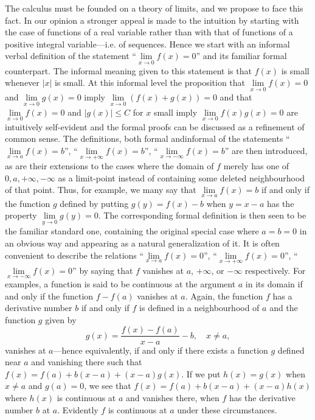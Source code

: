 The calculus must be founded on a theory of limits, and we propose to
face this fact. In our opinion a stronger appeal is made to the
intuition by starting with the case of functions of a real variable
rather than with that of functions of a positive integral
variable---i.e. of sequences. Hence we start with an informal verbal
definition of the statement ``$\lim\limits_{x \to 0} f (x) = 0$'' and
its familiar formal counterpart. The informal meaning given to this
statement is that $f(x)$ is small whenever $|x|$ is small. At this
informal level the proposition that $\lim\limits_{x \to 0} f(x) = 0$
and $\lim\limits_{x \to 0} g(x) = 0$ imply $\lim\limits_{x \to 0}
(f(x) + g(x)) = 0$ and that $\lim\limits_{x \to 0} f(x) = 0$ and
$|g(x)| \leqslant C$ for $x$ small imply $\lim\limits_{x \to 0} f(x)
g(x) = 0$ are intuitively self-evident and the formal proofs can be
discussed as a refinement of common sense. The definitions, both
formal and\pageoriginale informal of the statements ``$\lim\limits_{x \to a} f (x) =
b$'', ``$\lim\limits_{x \to + \infty} f(x) = b$'', ``$\lim\limits_{x
  \to - \infty} f (x) = b$'' are then introduced, as are their
extensions to the cases where the domain of $f$ merely has one of $0,
a, + \infty, -\infty$ as a limit-point instead of containing some
deleted neighbourhood of that point. Thus, for example, we many say
that $\lim\limits_{x \to a} f(x) = b$ if and  only if the function $g$
defined by putting $g(y) = f(x) - b$ when $y = x - a$ has the property
$\lim\limits_{y \to 0} g(y) =0$. The corresponding formal definition
is then seen to be the familiar standard one, containing the original
special case where $a =b = 0$ in an obvious way and appearing as a
natural generalization of it. It is often convenient to describe the
relations ``$\lim\limits_{x \to a} f(x) = 0$'', ``$\lim\limits_{x \to
  + \infty} f(x) = 0$'', ``$\lim\limits_{x \to - \infty} f(x) = 0$''
by saying that $f$ vanishes at $a$, $+ \infty$, or $-\infty$
respectively. For examples, a function is said to be continuous at the
argument $a$ in its domain if and only if the function $f - f(a)$
vanishes at $a$. Again, the function $f$ has a derivative number $b$
if and only if $f$ is defined in a neighbourhood of $a$ and the
function $g$ given by
$$
g(x) = \frac{f(x) - f(a)}{x - a} - b, \quad x \neq a,
$$
vanishes at $a$---hence equivalently, if and only if there exists a
function $g$ defined near $a$ and vanishing there such that $f(x) =
f(a) + b(x -a) + (x -a) g(x)$. If we put $h(x) = g(x)$ when $ x\neq a$
and $g(a) = 0$, we see that $f(x) = f(a) + b(x - a) + (x-a) h(x)$
where $h(x)$ is continuous at $a$ and vanishes there, when $f$ has the
derivative number $b$ at $a$. Evidently $f$ is continuous at $a$ under
these circumstances.

